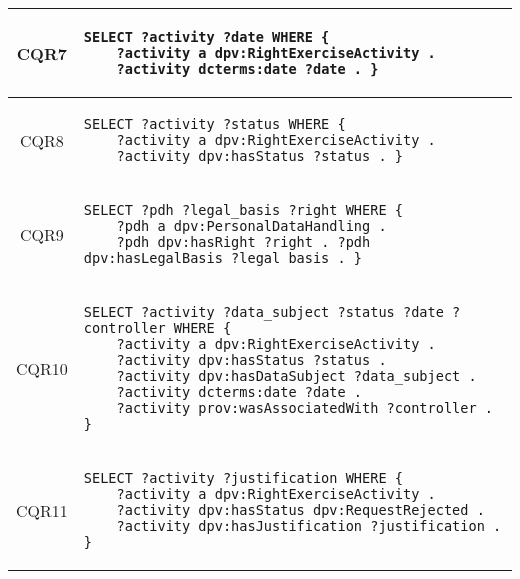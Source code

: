 \begin{table}[htp]
\begin{tabular}{c||l}
        \hline
        CQR7 & \begin{lstlisting}[numbers=none]
SELECT ?activity ?date WHERE {
    ?activity a dpv:RightExerciseActivity . 
    ?activity dcterms:date ?date . } \end{lstlisting} \\
        \hline
        CQR8 & \begin{lstlisting}[numbers=none]
SELECT ?activity ?status WHERE {
    ?activity a dpv:RightExerciseActivity . 
    ?activity dpv:hasStatus ?status . } \end{lstlisting} \\
        \hline
        CQR9 & \begin{lstlisting}[numbers=none]
SELECT ?pdh ?legal_basis ?right WHERE {
    ?pdh a dpv:PersonalDataHandling . 
    ?pdh dpv:hasRight ?right . ?pdh dpv:hasLegalBasis ?legal_basis . } \end{lstlisting} \\
        \hline
        CQR10 & \begin{lstlisting}[numbers=none]
SELECT ?activity ?data_subject ?status ?date ?controller WHERE {
    ?activity a dpv:RightExerciseActivity . 
    ?activity dpv:hasStatus ?status . 
    ?activity dpv:hasDataSubject ?data_subject . 
    ?activity dcterms:date ?date . 
    ?activity prov:wasAssociatedWith ?controller . } \end{lstlisting} \\
        \hline
        CQR11 & \begin{lstlisting}[numbers=none]
SELECT ?activity ?justification WHERE {
    ?activity a dpv:RightExerciseActivity . 
    ?activity dpv:hasStatus dpv:RequestRejected . 
    ?activity dpv:hasJustification ?justification . } \end{lstlisting} \\
    \end{tabular}
\end{table}